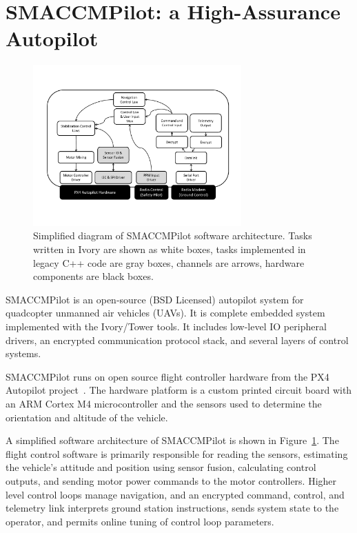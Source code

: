 \section{SMACCMPilot: a High-Assurance Autopilot}
\label{sec:smaccmpilot}

\begin{figure}[ht!]
  \begin{center}
\includegraphics[width=8cm]{figures/smaccmpilot-diagram-jan14}
  \end{center}
\caption[SMACCMPilot software architecture]{
Simplified diagram of SMACCMPilot
software architecture. Tasks written in Ivory are shown as white boxes,
tasks implemented in legacy C++ code are gray boxes,
channels are arrows,
hardware components are black boxes.}
\label{fig:smaccmpilotSwArch}
\end{figure}

SMACCMPilot is an open-source (BSD Licensed) autopilot system for quadcopter
unmanned air vehicles (UAVs).
It is complete embedded system implemented with
the Ivory/Tower tools.
It includes low-level IO peripheral drivers, an encrypted
communication protocol stack, and several layers of control systems.

SMACCMPilot runs on open source flight controller hardware from the PX4
Autopilot project~\cite{px4-proj}. The hardware platform is
a custom printed circuit board with an ARM Cortex M4 microcontroller and the
sensors used to determine the orientation and altitude of the vehicle.


A simplified software architecture of SMACCMPilot is shown in
Figure~\ref{fig:smaccmpilotSwArch}.
The flight control software is primarily responsible for reading the sensors,
estimating the vehicle's attitude and position using sensor fusion, calculating
control outputs, and sending motor power commands to the motor controllers.
Higher level control loops manage navigation, and an encrypted command, control,
and telemetry link interprets ground station instructions, sends system state to
the operator, and permits online tuning of control loop parameters.

